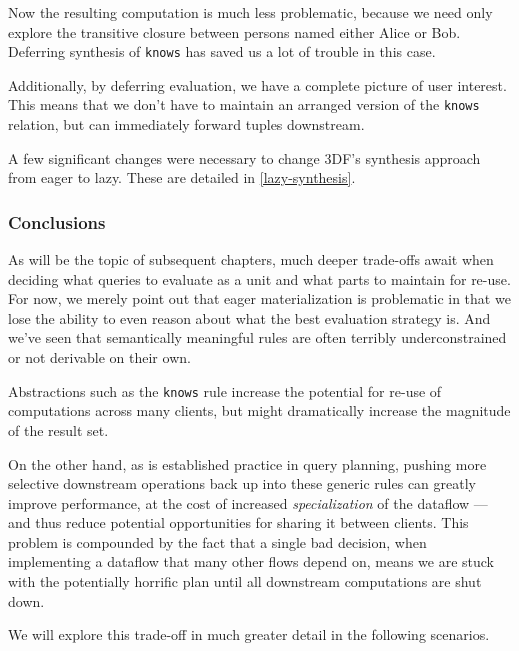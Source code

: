 \documentclass[../catalog.tex]{subfiles}
\begin{document}
Now the resulting computation is much less problematic, because we
need only explore the transitive closure between persons named either
Alice or Bob. Deferring synthesis of \texttt{knows} has saved us a lot
of trouble in this case.

Additionally, by deferring evaluation, we have a complete picture of
user interest. This means that we don't have to maintain an arranged
version of the \texttt{knows} relation, but can immediately forward
tuples downstream.

A few significant changes were necessary to change 3DF's synthesis
approach from eager to lazy. These are detailed in
\ref{lazy-synthesis}.

\subsubsection{Conclusions}

As will be the topic of subsequent chapters, much deeper trade-offs
await when deciding what queries to evaluate as a unit and what parts
to maintain for re-use. For now, we merely point out that eager
materialization is problematic in that we lose the ability to even
reason about what the best evaluation strategy is. And we've seen that
semantically meaningful rules are often terribly underconstrained or
not derivable on their own.

Abstractions such as the \texttt{knows} rule increase the potential
for re-use of computations across many clients, but might dramatically
increase the magnitude of the result set.

On the other hand, as is established practice in query planning,
pushing more selective downstream operations back up into these
generic rules can greatly improve performance, at the cost of
increased \emph{specialization} of the dataflow — and thus reduce
potential opportunities for sharing it between clients. This problem
is compounded by the fact that a single bad decision, when
implementing a dataflow that many other flows depend on, means we are
stuck with the potentially horrific plan until all downstream
computations are shut down.

We will explore this trade-off in much greater detail in the following
scenarios.
\end{document}
